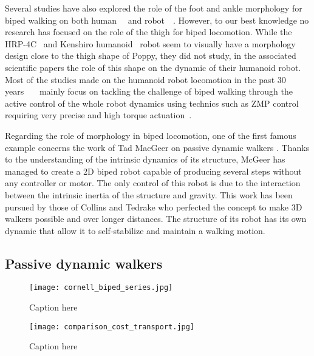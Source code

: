 Several studies have also explored the role of the foot and ankle morphology for biped walking on both human~\cite{Adamczyk2006}~\cite{Hughes1990} and robot~\cite{hobbelen2005ankle}~\cite{Davis2010}. However, to our best knowledge no research has focused on the role of the thigh for biped locomotion. While the HRP-4C~\cite{kaneko2009cybernetic} and Kenshiro humanoid~\cite{nakanishi2013design} robot seem to visually have a morphology design close to the thigh shape of Poppy, they did not study, in the associated scientific papers the role of this shape on the dynamic of their humanoid robot.
Most of the studies made on the humanoid robot locomotion in the past 30 years~\cite{park1998biped}~\cite{aoi2005locomotion}~\cite{park1998biped} mainly focus on tackling the challenge of biped walking through the active control of the whole robot dynamics using technics such as ZMP control~\cite{vukobratovic2004zero} requiring very precise and high torque actuation~\cite{akachi2005development}.

Regarding the role of morphology in biped locomotion, one of the first famous example concerns the work of Tad MacGeer on passive dynamic walkers \cite{mcgeer1990passive}. Thanks to the understanding of the intrinsic dynamics of its structure, McGeer has managed to create a 2D biped robot capable of producing several steps without any controller or motor. The only control of this robot is due to the interaction between the intrinsic inertia of the structure and gravity. This work has been pursued by those of Collins \cite{collins2001three} and Tedrake \cite{Tedrake2004}  who perfected the concept to make 3D walkers possible and over longer distances. The structure of its robot has its own dynamic that allow it to self-stabilize and maintain a walking motion.



\subsection{Passive dynamic walkers} %



\begin{figure}[]
    \begin{center}
        \texttt{[image: cornell\_biped\_series.jpg]}
    \end{center}
    \caption{Caption here}
    \label{fig:figure1}
\end{figure}

\begin{figure}[]
    \begin{center}
        \texttt{[image: comparison\_cost\_transport.jpg]}
    \end{center}
    \caption{Caption here}
    \label{fig:figure1}
\end{figure}



